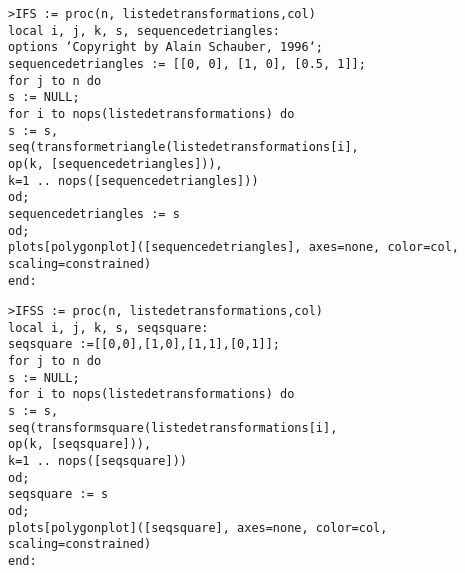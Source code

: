 	\texttt{>IFS := proc(n, liste\textunderscore de\textunderscore transformations,col)}\\
     \texttt{local i, j, k, s, sequence\textunderscore de\textunderscore triangles:}\\
     \texttt{options `Copyright by Alain Schauber, 1996`;}\\
     \texttt{sequence\textunderscore de\textunderscore triangles := [[0, 0], [1, 0], [0.5, 1]];}\\
     \texttt{for j to n do}\\
     \texttt{s := NULL;}\\
     \texttt{for i to nops(liste\textunderscore de\textunderscore transformations) do}\\
        \texttt{s := s,}\\
        \texttt{seq(transforme\textunderscore triangle(liste\textunderscore de\textunderscore transformations[i],}\\
        \texttt{op(k, [sequence\textunderscore de\textunderscore triangles])),}\\
        \texttt{k=1 .. nops([sequence\textunderscore de\textunderscore triangles]))}\\
       \texttt{od;}\\
      \texttt{sequence\textunderscore de\textunderscore triangles := s}\\
     \texttt{od;}\\
    \texttt{plots[polygonplot]([sequence\textunderscore de\textunderscore triangles], axes=none, color=col, scaling=constrained)}\\
  \texttt{end:}

	\texttt{>IFSS := proc(n, liste\textunderscore de\textunderscore transformations,col)}\\
     \texttt{local i, j, k, s, seq\textunderscore square:}\\
     \texttt{seq\textunderscore square :=[[0,0],[1,0],[1,1],[0,1]];}\\
     \texttt{for j to n do}\\
     \texttt{s := NULL;}\\
     \texttt{for i to nops(liste\textunderscore de\textunderscore transformations) do}\\
        \texttt{s := s,}\\
        \texttt{seq(transform\textunderscore square(liste\textunderscore de\textunderscore transformations[i],}\\
        \texttt{op(k, [seq\textunderscore square])),}\\
        \texttt{k=1 .. nops([seq\textunderscore square]))}\\
      \texttt{od;}\\
      \texttt{seq\textunderscore square := s }\\
    \texttt{od;}\\
   \texttt{plots[polygonplot]([seq\textunderscore square], axes=none, color=col, scaling=constrained)}\\
  \texttt{end:}\\
	
